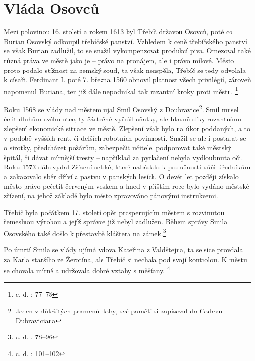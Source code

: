 \documentclass[a4paper,oneside,12p]{report}
\begin{document}
\section{Vláda Osovců}

Mezi polovinou 16. století a rokem 1613 byl Třebíč državou Osovců, poté co Burian Osovský odkoupil třebíčské panství.
Vzhledem k ceně třebíčského panství se však Burian zadlužil, to se snažil vykompenzovat produkcí piva.
Omezoval také různá práva ve městě jako je -- právo na pronájem, ale i právo mílové.
Město proto podalo stížnost na zemský soud, ta však neuspěla, Třebíč se tedy odvolala k císaři.
Ferdinant I. poté 7. března 1560 obnovil platnost všech privilégií, zároveň napomenul Buriana, ten již dále nepodnikal tak razantní kroky proti městu. \footnote{c. d. : 77--78}

Roku 1568 se vlády nad městem ujal Smil Osovský z Doubravice\footnote{Jeden z důležitých pramenů doby, své paměti si zapisoval do Codexu Dubraviciana}.
Smil musel čelit dluhům svého otce, ty částečně vyřešil sňatky, ale hlavně díky razantnímu zlepšení ekonomické situace ve městě.
Zlepšení však bylo na úkor poddaných, a to v podobě vyšších rent, či delších robotních povinností.
Snažil se ale i postarat se o sirotky, předcházet požárům, zabezpečit učitele, podporovat také městský špitál, či dávat mírnější tresty -- například za pytlačení nebyla vydloubnuta oči.
Roku 1573 dále vydal Zřízení selské, které nabádalo k poslušnosti vůči úředníkům a zakazovalo sběr dříví a pastvu v panských lesích.
O devět let později získalo město právo pečetit červeným voskem a hned v příštím roce bylo vydáno městské zřízení, na jehož základě bylo město zpravováno pánovými instrukcemi.

Třebíč byla počátkem 17. století opět prosperujícím městem s rozvinutou řemeslnou výrobou a jejíž správce již nebyl zadlužen.
Během správy Smila Osovského také došlo k přestavbě kláštera na zámek.\footnote{c. d. : 78--96}

Po úmrtí Smila se vlády ujímá vdova Kateřina z Valdštejna, ta se sice provdala za Karla staršího ze Žerotína, ale Třebíč si nechala pod svojí kontrolou.
K městu se chovala mírně a udržovala dobré vztahy s měšťany. \footnote{c. d. : 101--102}

\end{document}
